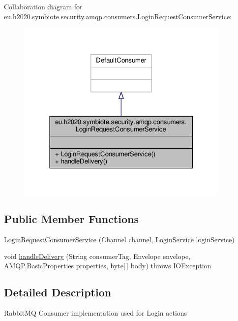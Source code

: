 Collaboration diagram for eu.\+h2020.\+symbiote.\+security.\+amqp.\+consumers.\+Login\+Request\+Consumer\+Service\+:
\nopagebreak
\begin{figure}[H]
\begin{center}
\leavevmode
\includegraphics[width=298pt]{classeu_1_1h2020_1_1symbiote_1_1security_1_1amqp_1_1consumers_1_1LoginRequestConsumerService__coll__graph}
\end{center}
\end{figure}
\subsection*{Public Member Functions}
\begin{DoxyCompactItemize}
\item 
\hyperlink{classeu_1_1h2020_1_1symbiote_1_1security_1_1amqp_1_1consumers_1_1LoginRequestConsumerService_a69c09badb0af0855ec3c07caa8306458}{Login\+Request\+Consumer\+Service} (Channel channel, \hyperlink{classeu_1_1h2020_1_1symbiote_1_1security_1_1services_1_1LoginService}{Login\+Service} login\+Service)
\item 
void \hyperlink{classeu_1_1h2020_1_1symbiote_1_1security_1_1amqp_1_1consumers_1_1LoginRequestConsumerService_af09972ec03b30e58f3e4f6cd85011e6e}{handle\+Delivery} (String consumer\+Tag, Envelope envelope, A\+M\+Q\+P.\+Basic\+Properties properties, byte\mbox{[}$\,$\mbox{]} body)  throws I\+O\+Exception 
\end{DoxyCompactItemize}


\subsection{Detailed Description}
Rabbit\+MQ Consumer implementation used for Login actions 

